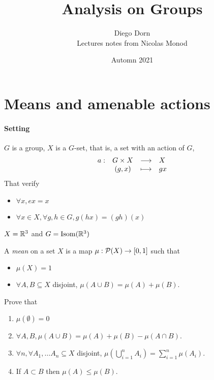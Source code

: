 


\title{Analysis on Groups}
\author{Diego Dorn \\ Lectures notes from Nicolas Monod}
\date{Automn 2021}

\newcommand{\Isom}{\mathrm{Isom}}
\newcommand{\acts}{\circlearrowright}


    \maketitle


    \section{Means and amenable actions}

    \paragraph{Setting} $G$ is a group, 
    $X$ is a $G$-set, that is, a set with an action of $G$, 
    \[
        \begin{array}{rccl} a : & G \times X & \longrightarrow & X \\ & (g, x) & \longmapsto & gx \end{array}
    \]
    That verify \begin{itemize}
        \item $\forall x, ex = x$
        \item $\forall x \in X, \forall g, h \in G, g(hx) = (gh)(x)$
    \end{itemize}

    \begin{example}
        $X = \mathbb R^3$ and $G = \Isom(\R^3)$
    \end{example}

    \begin{definition}
        A \emph{mean} on a set $X$ is a map 
        $\mu: \mathcal{P}(X) \to [0, 1]$
        such that \begin{itemize}
            \item $\mu(X) = 1$
            \item $\forall A, B \subseteq X$ disjoint, 
                $\mu(A \cup B) = \mu(A) + \mu(B)$.
        \end{itemize}
    \end{definition}

    \begin{exercise}
        Prove that 
        \begin{enumerate}
            \item $\mu(\emptyset) = 0$
            \item $\forall A, B, \mu(A \cup B) = \mu(A) + \mu(B) - \mu(A \cap B)$.
            \item $\forall n, \forall A_1, \dots A_n \subseteq X$ disjoint,
                $\mu(\bigcup_{i = 1}^n A_i) = \sum_{i = 1}^n \mu(A_i)$.
            \item If $A \subset B$ then $\mu(A) \leq \mu(B)$.
        \end{enumerate}
    \end{exercise}

